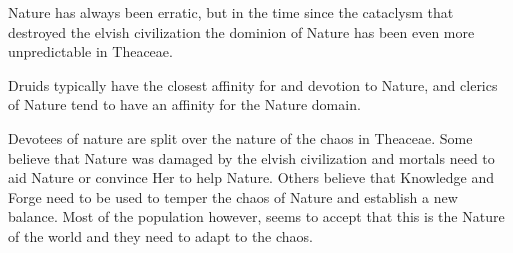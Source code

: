 Nature has always been erratic, but in the time since the cataclysm that destroyed the elvish civilization the dominion of Nature has been even more unpredictable in Theaceae.

Druids typically have the closest affinity for and devotion to Nature, and clerics of Nature tend to have an affinity for the Nature domain.

Devotees of nature are split over the nature of the chaos in Theaceae.
Some believe that Nature was damaged by the elvish civilization and mortals need to aid Nature or convince Her to help Nature.
Others believe that Knowledge and Forge need to be used to temper the chaos of Nature and establish a new balance.
Most of the population however, seems to accept that this is the Nature of the world and they need to adapt to the chaos.
